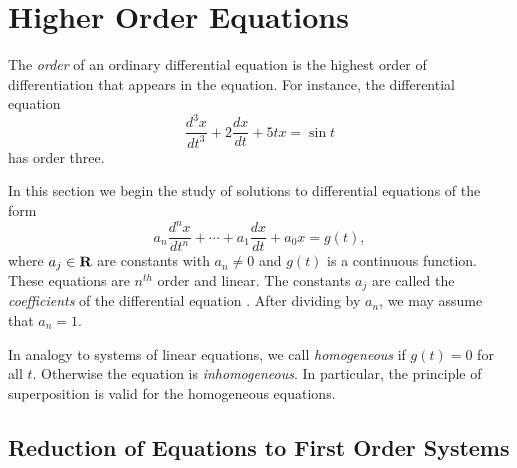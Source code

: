 \section{Higher Order Equations}
\label{sec:HighOrder}

The {\em order\/} of an ordinary differential equation is the highest 
order of differentiation that appears in the equation.  For instance, 
the differential equation  
\[
\frac{d^3x}{dt^3} + 2\frac{dx}{dt}+ 5tx = \sin t
\]
has order three. 

In this section we begin the study of solutions to differential equations 
of the form
\begin{equation}  \label{eq:nconst}
a_n\frac{d^nx}{dt^n} + \cdots + a_1\frac{dx}{dt}+a_0x = g(t),
\end{equation}
where $a_j\in\mbox{$\bf{R}$}$ are constants with $a_n\neq 0$ and $g(t)$ is a 
continuous function. These equations are $n^{th}$ order and linear. 
The constants $a_j$ are called the 
{\em coefficients\/} of the 
differential equation .  After dividing  by 
$a_n$, we may assume that $a_n=1$.  

In analogy to systems of linear equations, we call  
{\em homogeneous\/} if $g(t)=0$ for all $t$.  Otherwise the equation is 
{\em inhomogeneous}.   In particular, the principle of superposition is 
valid for the homogeneous equations.    

\subsection*{Reduction of Equations to First Order Systems}

